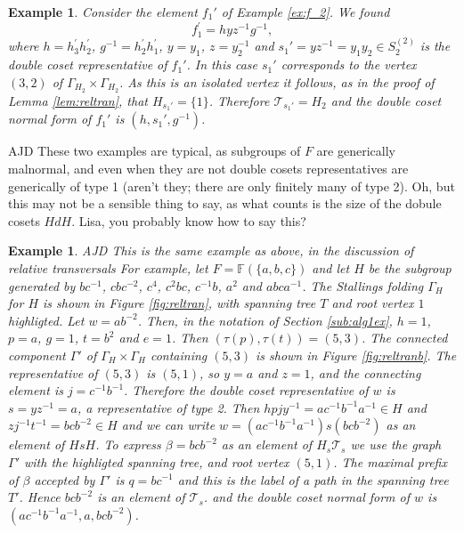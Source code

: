 \documentclass[a4paper,12pt]{article}
\renewcommand{\b}{\beta }
\newcommand{\G}{\Gamma }
\renewcommand{\t}{\tau }
\newtheorem{exam}[theorem]{Example}
\newenvironment{example}{\begin{exam} \rm}{\end{exam}}
\numberwithin{equation}{section}
\numberwithin{figure}{section}
\newcommand{\FF}{\ensuremath{\mathbb{F}}}
\newcommand{\cT}{\mathcal{T}}
\newenvironment{ajd1}{\noindent\color{red} AJD }{}
\newcommand{\ajd}[1]{\begin{ajd1} #1 \end{ajd1}}
\begin{document}
\begin{example}\label{ex:f_2_again}
Consider the element $f_1'$ of Example \ref{ex:f_2}. 
We found 
\[f_1^\prime=h yz^{-1} g^{-1},\]
where $h=h^\prime_3h_2^\prime$, $g^{-1}=h_2^\prime h_1^\prime$,  
$y=y_1$, $z=y_2^{-1}$ and $s_1'=yz^{-1}=y_1y_2\in S_2^{(2)}$ is the 
double coset representative of $f_1'$. In this case $s_1'$ corresponds
to the vertex $(3,2)$ of $\G_{H_2}\times \G_{H_2}$. As this is an 
isolated vertex it follows, as in the proof of Lemma \ref{lem:reltran},
that $H_{s_1'}=\{1\}$. Therefore $\cT_{s_1'}=H_2$ and the 
double coset normal form of $f_1'$ is 
$(h,s_1',g^{-1})$.  
\end{example}
\ajd{These two examples are typical, as subgroups of $F$ are generically
malnormal, and even when they are not 
double cosets representatives are generically of type 1 (aren't they; there
are only finitely many of type 2). Oh, but this may not be a sensible thing
to say, as what counts is the size of the dobule cosets $HdH$. Lisa,
you probably know how to say this?}
\begin{example}\label{ex:reltran}
\ajd{This is the same example as above, in the discussion of 
relative transversals} 
For example, let $F=\FF(\{a,b,c\})$ and let $H$ be the subgroup
 generated by $bc^{-1}$, $cbc^{-2}$, $c^4$, $c^2bc$, $c^{-1}b$, 
$a^2$ and $abca^{-1}$. The Stallings folding $\G_H$ for 
$H$ is shown in Figure \ref{fig:reltran}, with spanning tree
$T$ and root vertex $1$ highligted. Let $w=ab^{-2}$. Then, in 
the notation of Section \ref{sub:alg1ex}, $h=1$, $p=a$, $g=1$, $t=b^{2}$
and $e=1$. Then $(\t(p),\t(t))=(5,3)$. The connected component $\G'$ 
of $\G_H\times \G_H$ containing $(5,3)$ is shown in Figure 
\ref{fig:reltranb}. The representative of $(5,3)$ is 
$(5,1)$, so $y=a$ and $z=1$, and the  connecting element is  $j=c^{-1}b^{-1}$. 
Therefore the double coset representative of $w$ is $s=yz^{-1}=a$, a 
representative of type 2. 
Then $hpjy^{-1}=ac^{-1}b^{-1}a^{-1}\in H$ and $zj^{-1}t^{-1}=bcb^{-2}\in H$ and we 
can write $w=(ac^{-1}b^{-1}a^{-1})s(bcb^{-2})$ as an element of $HsH$.
To express $\b=bcb^{-2}$ as an element of $H_s\cT_s$ we use the
graph $\G'$ with the highligted spanning tree, and 
root vertex $(5,1)$. The maximal prefix of $\b$ accepted by 
$\G'$ is $q=bc^{-1}$ and this is the label of a path in the 
spanning tree $T'$. Hence $bcb^{-2}$ is an element of $\cT_s$. 
and 
 the double coset normal form of $w$ is $(ac^{-1}b^{-1}a^{-1}, a, 
bcb^{-2})$.
\end{example}
\end{document}
